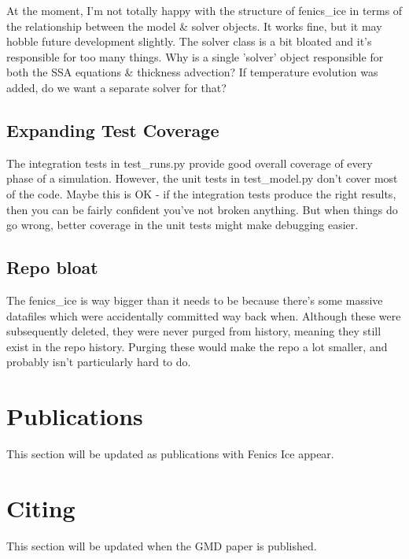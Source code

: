 \documentclass[11pt, reqno, nocenter]{article}
\begin{document}
At the moment, I'm not totally happy with the structure of fenics\_ice in terms of the relationship between the model \& solver objects. It works fine, but it may hobble future development slightly. The solver class is a bit bloated and it's responsible for too many things. Why is a single 'solver' object responsible for both the SSA equations \& thickness advection? If temperature evolution was added, do we want a separate solver for that?

\subsection{Expanding Test Coverage}

The integration tests in test\_runs.py provide good overall coverage of every phase of a simulation. However, the unit tests in test\_model.py don't cover most of the code. Maybe this is OK - if the integration tests produce the right results, then you can be fairly confident you've not broken anything. But when things do go wrong, better coverage in the unit tests might make debugging easier.

\subsection{Repo bloat}

The fenics\_ice is way bigger than it needs to be because there's some massive datafiles which were accidentally committed way back when. Although these were subsequently deleted, they were never purged from history, meaning they still exist in the repo history. Purging these would make the repo a lot smaller, and probably isn't particularly hard to do.

\section{Publications}
This section will be updated as publications with Fenics Ice appear.

\section{Citing}
This section will be updated when the GMD paper is published.



\newpage


\end{document}
